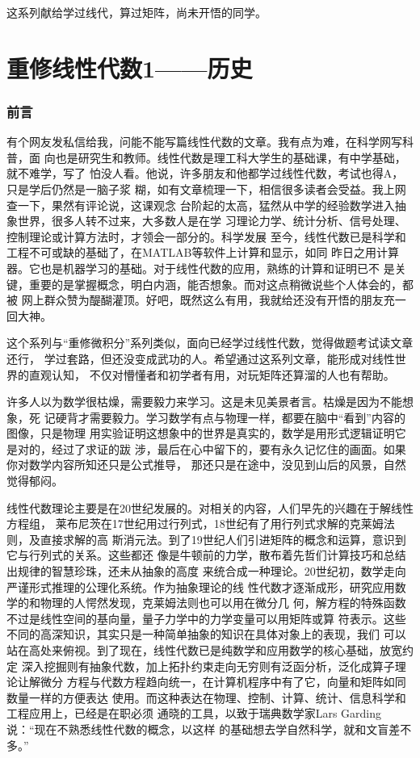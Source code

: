 这系列献给学过线代，算过矩阵，尚未开悟的同学。
\chapter{重修线性代数1——历史}
\subsection{前言}
有个网友发私信给我，问能不能写篇线性代数的文章。我有点为难，在科学网写科普，面
向也是研究生和教师。线性代数是理工科大学生的基础课，有中学基础，就不难学，写了
怕没人看。他说，许多朋友和他都学过线性代数，考试也得A，只是学后仍然是一脑子浆
糊，如有文章梳理一下，相信很多读者会受益。我上网查一下，果然有评论说，这课观念
台阶起的太高，猛然从中学的经验数学进入抽象世界，很多人转不过来，大多数人是在学
习理论力学、统计分析、信号处理、控制理论或计算方法时，才领会一部分的。科学发展
至今，线性代数已是科学和工程不可或缺的基础了，在MATLAB等软件上计算和显示，如同
昨日之用计算器。它也是机器学习的基础。对于线性代数的应用，熟练的计算和证明已不
是关键，重要的是掌握概念，明白内涵，能否想象。而对这点稍微说些个人体会的，都被
网上群众赞为醍醐灌顶。好吧，既然这么有用，我就给还没有开悟的朋友充一回大神。

这个系列与“重修微积分”系列类似，面向已经学过线性代数，觉得做题考试读文章还行，
学过套路，但还没变成武功的人。希望通过这系列文章，能形成对线性世界的直观认知，
不仅对懵懂者和初学者有用，对玩矩阵还算溜的人也有帮助。

许多人以为数学很枯燥，需要毅力来学习。这是未见美景者言。枯燥是因为不能想象，死
记硬背才需要毅力。学习数学有点与物理一样，都要在脑中“看到”内容的图像，只是物理
用实验证明这想象中的世界是真实的，数学是用形式逻辑证明它是对的，经过了求证的跋
涉，最后在心中留下的，要有永久记忆住的画面。如果你对数学内容所知还只是公式推导，
那还只是在途中，没见到山后的风景，自然觉得郁闷。

线性代数理论主要是在20世纪发展的。对相关的内容，人们早先的兴趣在于解线性方程组，
莱布尼茨在17世纪用过行列式，18世纪有了用行列式求解的克莱姆法则，及直接求解的高
斯消元法。到了19世纪人们引进矩阵的概念和运算，意识到它与行列式的关系。这些都还
像是牛顿前的力学，散布着先哲们计算技巧和总结出规律的智慧珍珠，还未从抽象的高度
来统合成一种理论。20世纪初，数学走向严谨形式推理的公理化系统。作为抽象理论的线
性代数才逐渐成形，研究应用数学的和物理的人愕然发现，克莱姆法则也可以用在微分几
何，解方程的特殊函数不过是线性空间的基向量，量子力学中的力学变量可以用矩阵或算
符表示。这些不同的高深知识，其实只是一种简单抽象的知识在具体对象上的表现，我们
可以站在高处来俯视。到了现在，线性代数已是纯数学和应用数学的核心基础，放宽约定
深入挖掘则有抽象代数，加上拓扑约束走向无穷则有泛函分析，泛化成算子理论让解微分
方程与代数方程趋向统一，在计算机程序中有了它，向量和矩阵如同数量一样的方便表达
使用。而这种表达在物理、控制、计算、统计、信息科学和工程应用上，已经是在职必须
通晓的工具，以致于瑞典数学家Lars Garding说：“现在不熟悉线性代数的概念，以这样
的基础想去学自然科学，就和文盲差不多。”

